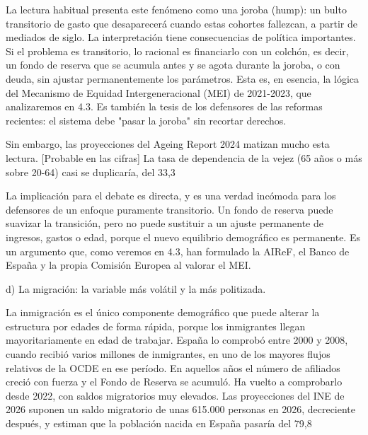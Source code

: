 \documentclass[10pt,a4paper]{article}
\begin{document}
La lectura habitual presenta este fenómeno como una joroba (hump): un bulto transitorio de gasto que desaparecerá cuando estas cohortes fallezcan, a partir de mediados de siglo. La interpretación tiene consecuencias de política importantes. Si el problema es transitorio, lo racional es financiarlo con un colchón, es decir, un fondo de reserva que se acumula antes y se agota durante la joroba, o con deuda, sin ajustar permanentemente los parámetros. Esta es, en esencia, la lógica del Mecanismo de Equidad Intergeneracional (MEI) de 2021-2023, que analizaremos en 4.3. Es también la tesis de los defensores de las reformas recientes: el sistema debe "pasar la joroba" sin recortar derechos.

Sin embargo, las proyecciones del Ageing Report 2024 matizan mucho esta lectura. [Probable en las cifras] La tasa de dependencia de la vejez (65 años o más sobre 20-64) casi se duplicaría, del 33,3%

La implicación para el debate es directa, y es una verdad incómoda para los defensores de un enfoque puramente transitorio. Un fondo de reserva puede suavizar la transición, pero no puede sustituir a un ajuste permanente de ingresos, gastos o edad, porque el nuevo equilibrio demográfico es permanente. Es un argumento que, como veremos en 4.3, han formulado la AIReF, el Banco de España y la propia Comisión Europea al valorar el MEI.

d) La migración: la variable más volátil y la más politizada.

La inmigración es el único componente demográfico que puede alterar la estructura por edades de forma rápida, porque los inmigrantes llegan mayoritariamente en edad de trabajar. España lo comprobó entre 2000 y 2008, cuando recibió varios millones de inmigrantes, en uno de los mayores flujos relativos de la OCDE en ese período. En aquellos años el número de afiliados creció con fuerza y el Fondo de Reserva se acumuló. Ha vuelto a comprobarlo desde 2022, con saldos migratorios muy elevados. Las proyecciones del INE de 2026 suponen un saldo migratorio de unas 615.000 personas en 2026, decreciente después, y estiman que la población nacida en España pasaría del 79,8%
\end{document}
